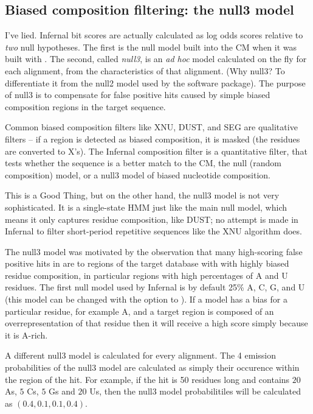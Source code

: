 \subsection{Biased composition filtering: the null3 model}

I've lied. Infernal bit scores are actually calculated as
log odds scores relative to \emph{two} null hypotheses. The first is the null model
built into the CM when it was built with .
The second, called \emph{null3}, is an \emph{ad hoc} model calculated
on the fly for each alignment, from the characteristics of that
alignment. (Why null3? To differentiate it from the null2 model used
by the  software package). The purpose of null3 is to
compensate for false positive hits caused by simple biased composition
regions in the target sequence.

Common biased composition filters like XNU, DUST, and SEG are
qualitative filters -- if a region is detected as biased composition,
it is masked (the residues are converted to X's).  The
Infernal composition filter is a quantitative filter, that
tests whether the sequence is a better match to the CM, the
null (random composition) model, or a null3 model of biased nucleotide
composition.

This is a Good Thing, but on the other hand, the null3 model is not
very sophisticated. It is a single-state HMM just like the main null
model, which means it only captures residue composition, like DUST; no
attempt is made in Infernal to filter short-period repetitive sequences
like the XNU algorithm does. 

The null3 model was motivated by the observation that many
high-scoring false positive hits in  are to regions of
the target database with with highly biased residue composition, in
particular regions with high percentages of A and U residues. The
first null model used by Infernal is by default 25\% A, C,
G, and U (this model can be changed with the  option to
). If a model has a bias for a particular residue, for
example A, and a target region is composed of an overrepresentation
of that residue then it will receive a high score simply because it is
A-rich. 


A different null3 model is calculated for every alignment. The 4
emission probabilities of the null3 model are calculated as 
simply their occurence within the region of the hit. For example, if
the hit is 50 residues long and contains $20$ As, $5$ Cs, $5$ Gs and $20$ Us,
then the null3 model probabilitiles will be calculated as $(0.4, 0.1,
0.1, 0.4)$. 

